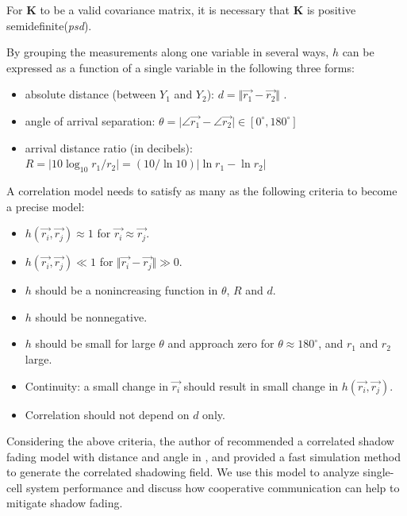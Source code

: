 For $\mathbf{K}$ to be a valid covariance matrix, it is necessary that $\mathbf{K}$ is positive semidefinite(\emph{psd}).
\par By grouping the measurements along one variable in several ways, $h$ can be expressed as a function of a single variable in the following three forms:
\begin{itemize}
\item absolute distance (between $Y_{1}$ and $Y_{2}$): $d = \Vert \vec{r_{1}}- \vec{r_{2}}\Vert$ .
\item angle of arrival separation: $\theta = \vert\angle\vec{r_{1}}-\angle\vec{r_{2}}\vert\in [0^\circ, 180^\circ]$ 
\item arrival distance ratio (in decibels): $R=\vert10\log_{10}r_{1}/r_{2}\vert=(10/\ln 10)\vert \ln r_{1}-\ln r_{2}\vert$
\end{itemize}
A correlation model needs to satisfy as many as the following criteria to become a precise model:
\begin{itemize}
\item $h(\vec{r_{i}}, \vec{r_{j}}) \approx 1$ for $\vec{r_{i}}\approx \vec{r_{j}}$.
\item $h(\vec{r_{i}}, \vec{r_{j}}) \ll 1$ for $\Vert \vec{r_{i}}- \vec{r_{j}}\Vert\gg0$.
\item $h$ should be a nonincreasing function in $\theta$, $R$ and $d$.
\item $h$ should be nonnegative.
\item $h$ should be small for large $\theta$ and approach zero for $\theta\approx180^\circ$, and $r_{1}$ and $r_{2}$ large.
\item Continuity: a small change in $\vec{r_{i}}$ should result in small change in $h(\vec{r_{i}}, \vec{r_{j}})$.
\item Correlation should not depend on $d$ only.
\end{itemize}
Considering the above criteria, the author of \cite{szyszkowicz2010feasibility} recommended a correlated shadow fading model with distance and angle in \cite{szyszkowicz2011interference}, and provided a fast simulation method to generate the correlated shadowing field. We use this model to analyze single-cell system performance and discuss how cooperative communication can help to mitigate shadow fading. 

